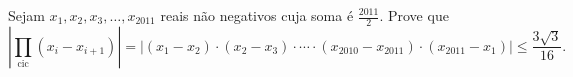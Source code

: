 Sejam $x_1, x_2, x_3, \dots, x_{2011}$ reais não negativos cuja soma é $\frac{2011}{2}$.
Prove que
$$\left | \prod_\mathrm{cic} (x_i - x_{i+1}) \right | =
\left | (x_1 - x_2) \cdot (x_2 - x_3) \cdot \cdots \cdot (x_{2010} - x_{2011}) \cdot (x_{2011} - x_1) \right | \le \frac{3\sqrt{3}}{16}.$$ 
